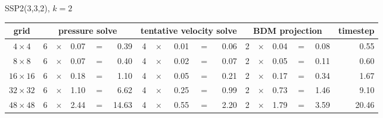 \begin{center}
    SSP2(3,3,2), $k=2$\\[1ex]
    \begin{tabular}{|c|rcrcr|rcrcr|rcrcr|r|}
        \hline
        grid                                           &
        \multicolumn{5}{|c|}{pressure solve}           &
        \multicolumn{5}{|c|}{tentative velocity solve} &
        \multicolumn{5}{|c|}{BDM projection}           &
        timestep                                                                                                                                                         \\
        \hline\hline
        $ 4\times 4$                                   & 6 & $\times$ & 0.07 & $=$ & 0.39  & 4 & $\times$ & 0.01 & $=$ & 0.06 & 2 & $\times$ & 0.04 & $=$ & 0.08 & 0.55  \\
        $ 8\times 8$                                   & 6 & $\times$ & 0.07 & $=$ & 0.40  & 4 & $\times$ & 0.02 & $=$ & 0.07 & 2 & $\times$ & 0.05 & $=$ & 0.11 & 0.60  \\
        $16\times16$                                   & 6 & $\times$ & 0.18 & $=$ & 1.10  & 4 & $\times$ & 0.05 & $=$ & 0.21 & 2 & $\times$ & 0.17 & $=$ & 0.34 & 1.67  \\
        $32\times32$                                   & 6 & $\times$ & 1.10 & $=$ & 6.62  & 4 & $\times$ & 0.25 & $=$ & 0.99 & 2 & $\times$ & 0.73 & $=$ & 1.46 & 9.10  \\
        $48\times48$                                   & 6 & $\times$ & 2.44 & $=$ & 14.63 & 4 & $\times$ & 0.55 & $=$ & 2.20 & 2 & $\times$ & 1.79 & $=$ & 3.59 & 20.46 \\
        \hline\end{tabular}
\end{center}

